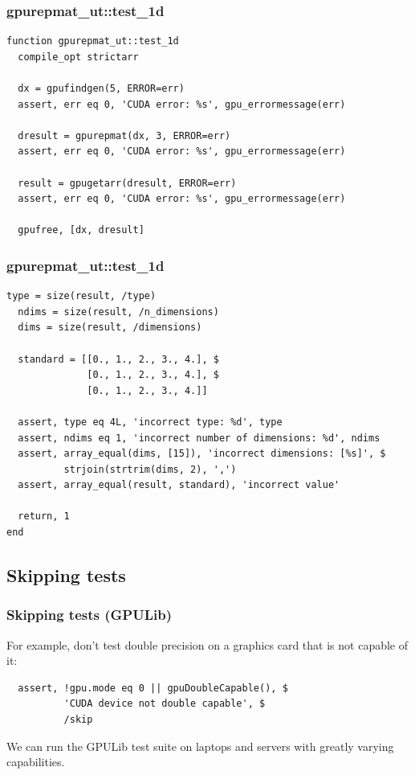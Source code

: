\documentclass[12pt, handout]{beamer}
\begin{document}
\begin{frame}[t, fragile]
  \frametitle{gpurepmat\_ut::test\_1d}

\begin{lstlisting}[basicstyle=\ttfamily\fontsize{8pt}{8pt}\selectfont]
function gpurepmat_ut::test_1d
  compile_opt strictarr

  dx = gpufindgen(5, ERROR=err)
  assert, err eq 0, 'CUDA error: %s', gpu_errormessage(err)

  dresult = gpurepmat(dx, 3, ERROR=err)
  assert, err eq 0, 'CUDA error: %s', gpu_errormessage(err)

  result = gpugetarr(dresult, ERROR=err)
  assert, err eq 0, 'CUDA error: %s', gpu_errormessage(err)

  gpufree, [dx, dresult]
\end{lstlisting}
\end{frame}

\begin{frame}[t, fragile]
  \frametitle{gpurepmat\_ut::test\_1d}

\begin{lstlisting}[basicstyle=\ttfamily\fontsize{8pt}{8pt}\selectfont]
  type = size(result, /type)
  ndims = size(result, /n_dimensions)
  dims = size(result, /dimensions)

  standard = [[0., 1., 2., 3., 4.], $
              [0., 1., 2., 3., 4.], $
              [0., 1., 2., 3., 4.]]

  assert, type eq 4L, 'incorrect type: %d', type
  assert, ndims eq 1, 'incorrect number of dimensions: %d', ndims
  assert, array_equal(dims, [15]), 'incorrect dimensions: [%s]', $
          strjoin(strtrim(dims, 2), ',')
  assert, array_equal(result, standard), 'incorrect value'

  return, 1
end
\end{lstlisting}
\end{frame}


\subsection{Skipping tests}

\begin{frame}[t, fragile]
  \frametitle{Skipping tests (GPULib)}
For example, don't test double precision on a graphics card that is not capable of it:
\begin{lstlisting}
  assert, !gpu.mode eq 0 || gpuDoubleCapable(), $
          'CUDA device not double capable', $
          /skip
\end{lstlisting}
We can run the GPULib test suite on laptops and servers with greatly varying capabilities.
\end{frame}
\end{document}
